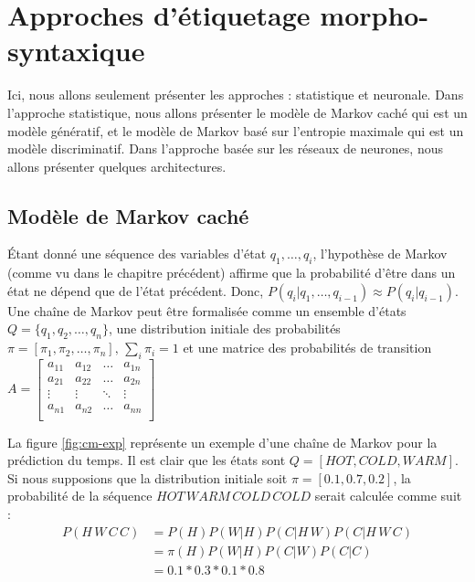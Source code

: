 \documentclass{KodeBook}
\begin{document}
\section{Approches d'étiquetage morpho-syntaxique}

Ici, nous allons seulement présenter les approches : statistique et neuronale.
Dans l'approche statistique, nous allons présenter le modèle de Markov caché qui  est un modèle génératif, et le modèle de Markov basé sur l'entropie maximale qui est un modèle discriminatif. 
Dans l'approche basée sur les réseaux de neurones, nous allons présenter quelques architectures.

\subsection{Modèle de Markov caché}

Étant donné une séquence des variables d'état $q_1, \ldots, q_i$, l'hypothèse de Markov (comme vu dans le chapitre précédent) affirme que la probabilité d'être dans un état ne dépend que de l'état précédent.
Donc, $ P(q_i | q_1, \ldots, q_{i-1}) \approx P(q_i | q_{i-1}) $.
Une chaîne de Markov peut être formalisée comme un ensemble d'états $Q = \{q_1, q_2, \ldots, q_n\}$, une distribution initiale des probabilités $\pi = [\pi_1, \pi_2, \ldots, \pi_n ],\, \sum_i \pi_i = 1$ et une matrice des  probabilités de transition
$
A = \begin{bmatrix}%
a_{11} & a_{12} & \ldots & a_{1n} \\
a_{21} & a_{22} & \ldots & a_{2n} \\
\vdots & \vdots & \ddots & \vdots \\
a_{n1} & a_{n2} & \ldots & a_{nn} \\
\end{bmatrix}
$

La figure \ref{fig:cm-exp} représente un exemple d'une chaîne de Markov pour la prédiction du temps. 
Il est clair que les états sont $Q = [HOT, COLD, WARM]$. 
Si nous supposions que la distribution initiale soit $\pi = [0.1, 0.7, 0.2]$, la probabilité de la séquence $HOT\, WARM\, COLD\, COLD$ serait calculée comme suit :
\begin{align*}
P(H\, W\, C\, C) & = P(H) P(W | H) P(C | H\, W) P(C | H\, W\, C) \\
& = \pi(H) P(W | H) P(C | W) P(C | C) \\
& = 0.1 * 0.3 * 0.1 * 0.8 \\
\end{align*}
\end{document}
